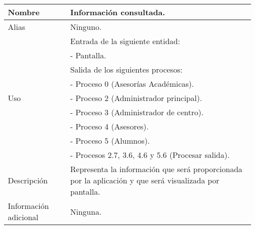 \begin{center}
  \begin{tabular}{| l | p{9cm} |}
    \hline
    Nombre & \textbf{Información consultada}.\\
    \hline
    Alias & Ninguno.\\
    \hline
    \multirow{9}{*}{Uso} & Entrada de la siguiente entidad:\\
                         & - Pantalla.\\
                         & Salida de los siguientes procesos:\\
                         & - Proceso 0 (Asesorías Académicas).\\
                         & - Proceso 2 (Administrador principal).\\
                         & - Proceso 3 (Administrador de centro).\\
                         & - Proceso 4 (Asesores).\\
                         & - Proceso 5 (Alumnos).\\
                         & - Procesos 2.7, 3.6, 4.6 y 5.6 (Procesar salida).\\
    \hline
    Descripción & Representa la información que será proporcionada por la
                  aplicación y que será visualizada por pantalla.\\
    \hline
    Información adicional & Ninguna.\\
    \hline
  \end{tabular}
\end{center}
